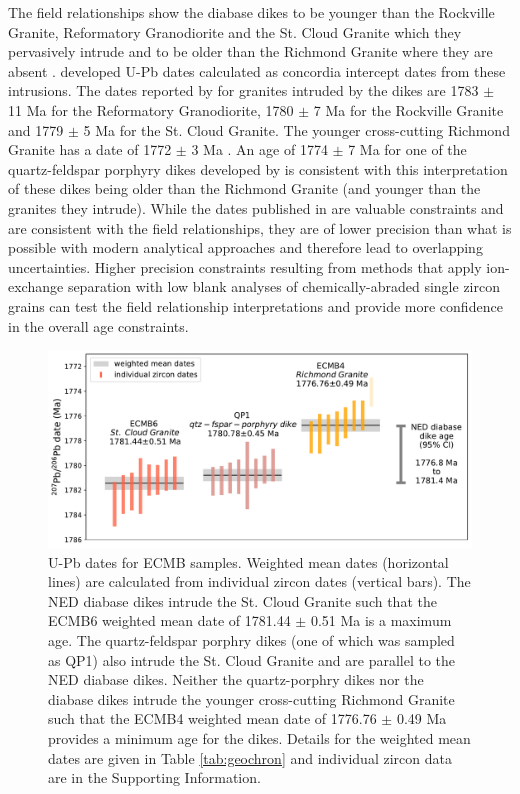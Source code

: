 \documentclass[draft]{agujournal2019}
\begin{document}
The field relationships show the diabase dikes to be younger than the Rockville Granite, Reformatory Granodiorite and the St. Cloud Granite which they pervasively intrude and to be older than the Richmond Granite where they are absent \cite{Boerboom2005b}.  developed U-Pb dates calculated as concordia intercept dates from these intrusions. The dates reported by  for granites intruded by the dikes are 1783 $\pm$ 11 Ma for the Reformatory Granodiorite, 1780 $\pm$ 7 Ma for the Rockville Granite and 1779 $\pm$ 5 Ma for the St. Cloud Granite. The younger cross-cutting Richmond Granite has a date of 1772 $\pm$ 3 Ma \cite{Holm2005a}. An age of 1774 $\pm$ 7 Ma for one of the quartz-feldspar porphyry dikes developed by  is consistent with this interpretation of these dikes being older than the Richmond Granite (and younger than the granites they intrude). While the dates published in  are valuable constraints and are consistent with the field relationships, they are of lower precision than what is possible with modern analytical approaches and therefore lead to overlapping uncertainties. Higher precision constraints resulting from methods that apply ion-exchange separation with low blank analyses of chemically-abraded single zircon grains can test the field relationship interpretations and provide more confidence in the overall age constraints.

\begin{figure}[!ht]
\centering
\noindent\includegraphics[width=\textwidth]{./figures/ECMB_new_U_Pb_dates.pdf}
\caption{\small{U-Pb dates for ECMB samples. Weighted mean dates (horizontal lines) are calculated from individual zircon dates (vertical bars). The NED diabase dikes intrude the St. Cloud Granite such that the ECMB6 weighted mean date of 1781.44 $\pm$ 0.51 Ma is a maximum age. The quartz-feldspar porphry dikes (one of which was sampled as QP1) also intrude the St. Cloud Granite and are parallel to the NED diabase dikes. Neither the quartz-porphry dikes nor the diabase dikes intrude the younger cross-cutting Richmond Granite such that the ECMB4 weighted mean date of 1776.76 $\pm$ 0.49 Ma provides a minimum age for the dikes. Details for the weighted mean dates are given in Table \ref{tab:geochron} and individual zircon data are in the Supporting Information.}}
\label{fig:U_Pb_dates}
\end{figure}
\end{document}
